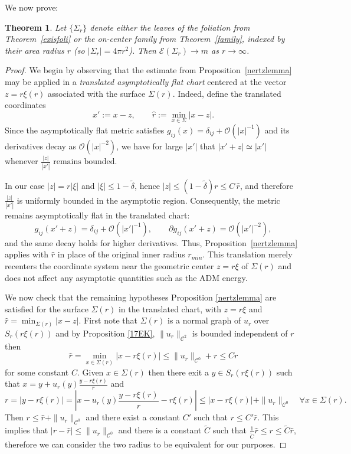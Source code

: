 \documentclass[12pt,a4paper]{amsart}
\theoremstyle{plain}
\newtheorem{theorem}{Theorem}[section]
\theoremstyle{definition}
\begin{document}
 We now prove:
\begin{theorem}\label{largesphere}
Let $\{\Sigma_r\}$ denote either the leaves of the foliation from Theorem~\ref{exisfoli} or the on-center family from Theorem~\ref{family}, indexed by their area radius $r$ (so $|\Sigma_r|=4\pi r^{2}$). Then $ \mathcal{E}(\Sigma_r)\to m $ as $r \to \infty$.
\end{theorem}
\begin{proof}
We begin by observing that the estimate from Proposition~\ref{nertzlemma}
may be applied in a \emph{translated asymptotically flat chart} centered at the vector 
$z = r\xi(r)$ associated with the surface $\Sigma(r) $.
Indeed, define the translated coordinates 
\[
x' := x - z,
\qquad 
\hat r := \min_{x\in\Sigma}|x - z|.
\]
Since the asymptotically flat metric satisfies 
$g_{ij}(x) = \delta_{ij} + \mathcal{O}(|x|^{-1})$ and its derivatives decay as 
$\mathcal{O}(|x|^{-2})$, we have for large $|x'|$ that $|x'+z| \simeq |x'|$
whenever $\frac{|z|}{|x'|} \text{ remains bounded.}
$

In our case $|z| = r|\xi|$ and $|\xi|\le 1-\tilde{\delta}$, hence 
$|z|\le (1-\tilde{\delta})r \le C\,\hat r$, and therefore 
$\frac{|z|}{|x'|}$ is uniformly bounded in the asymptotic region.
Consequently, the metric remains asymptotically flat 
in the translated chart:
\[
g_{ij}(x'+z) = \delta_{ij} + \mathcal{O}(|x'|^{-1}), 
\qquad 
\partial g_{ij}(x'+z) = \mathcal{O}(|x'|^{-2}),
\]
and the same decay holds for higher derivatives.
Thus, Proposition~\ref{nertzlemma} applies  with $\hat r$ in place of the 
original inner radius $r_{min}$.
This translation merely recenters the coordinate system near the geometric 
center $z=r\xi$ of $\Sigma(r)$ and does not affect any asymptotic 
quantities such as the ADM energy.


We now check that the remaining hypotheses Proposition \ref{nertzlemma} are satisfied for the surface $\Sigma(r)$ in the 
translated chart, with $z=r\xi$ and $\hat r = \min_{\Sigma(r)}|x-z|$.  First note that  $\Sigma(r)$ is a normal graph of $u_r$ over $S_r(r\xi(r))$ and  by Proposition \ref{17EK}, $\|u_r\|_{\mathcal{C}^2}$ is bounded independent of $r$ then  
$$\hat r = \min_{x\in\Sigma(r)}|x-r\xi(r)|\leq \|u_r\|_{\mathcal{C}^0} +r\leq C r$$ 
for some constant $C$.  Given $x\in \Sigma(r)$ then there exit a $y \in S_r(r\xi(r)) $ such that $x=y+u_r(y)\frac{y-r\xi(r)}{r}$ and 
$$r=|y-r\xi(r) |=|x-u_r(y)\frac{y-r\xi(r)}{r}-r\xi(r) | \leq  |x-r\xi(r) |+\|u_r\|_{\mathcal{C}^0} \quad \forall x\in \Sigma(r) .$$ 
Then $r \leq \hat{r} + \|u_r\|_{\mathcal{C}^0}$ and  there exist a constant $C'$ such that $r \leq  C'\hat{r}$. This implies that $|r -\hat{r}| \leq \|u_r\|_{\mathcal{C}^0} $ and there is a constant $\tilde{C}$ such that $ \frac{1}{\tilde{C}}\hat{r}\leq r \leq\tilde{C} \hat{r}$,  therefore we can consider the two radius to be equivalent for our purposes.  


\end{proof}
\end{document}
